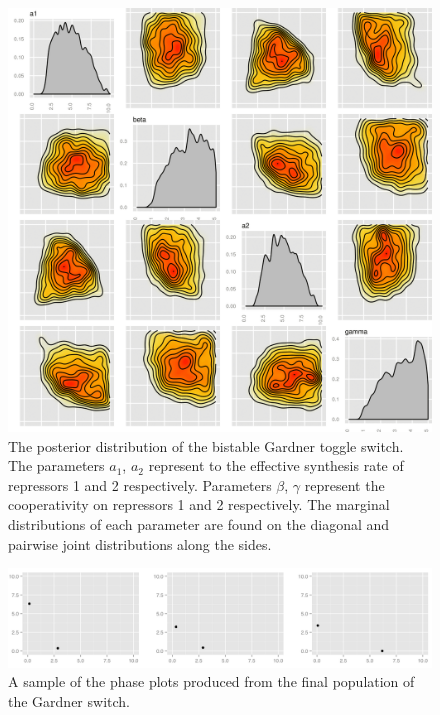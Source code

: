 \cleardoublepage
\begin{figure}[t]
\centering
\includegraphics[scale=0.2]{chapterStabilityFinder/images/Gardner/posterior.png}
\caption[The posterior distribution of the bistable Gardner toggle switch]{The posterior distribution of the bistable Gardner toggle switch. The parameters $a_1$, $a_2$ represent to the effective synthesis rate of repressors 1 and 2 respectively. Parameters $\beta$, $\gamma$ represent the cooperativity on repressors 1 and 2 respectively. The marginal distributions of each parameter are found on the diagonal and pairwise joint distributions along the sides.}
\label{fig:Gard_post}
\end{figure}


\begin{figure}[t]
\centering
\includegraphics[scale=0.3]{chapterStabilityFinder/images/Gardner/phase_plots.png}
\caption{A sample of the phase plots produced from the final population of the Gardner switch.}
\label{fig:det_gard_phase}
\end{figure}

